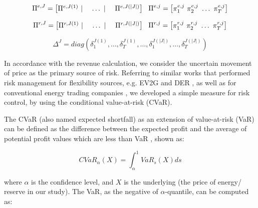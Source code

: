 \begin{equation}
\Pi^{e,J} =
\begin{bmatrix}
\Pi^{e,J(1)}~|~&\dots~|~&\Pi^{e,J(|J|)}
\end{bmatrix} ~~~\\
\Pi^{e,j} = 
\begin{bmatrix}
\pi_1^{e,j}~\pi_2^{e,j}~\dots~\pi_T^{e,j}
\end{bmatrix}
\end{equation}

\begin{equation}
\Pi^{r,J} =
\begin{bmatrix}
\Pi^{r,J(1)}~|~&\dots~|~&\Pi^{r,J(|J|)}
\end{bmatrix} ~~~\\
\Pi^{r,j} = 
\begin{bmatrix}
\pi_1^{r,j}~\pi_2^{r,j}~\dots~\pi_T^{r,j}
\end{bmatrix}
\end{equation}

\begin{equation}
\label{eq:decision-f-revenue-end}
\Delta^J = diag (
\delta_1^{J(1)}, \dots , \delta_T^{J(1)}, \dots, \delta_1^{J(|J|)}, \dots, \delta_T^{J(|J|)})
\end{equation}

In accordance with the revenue calculation, we consider the uncertain movement of price as the primary source of risk. Referring to similar works that performed risk management for flexibility sources, e.g. EV2G \cite{Alipour2017} and DER \cite{Han2017}, as well as for conventional energy trading companies \cite{Mohammadi-Ivatloo2013}, we developed a simple measure for risk control, by using the conditional value-at-risk (CVaR).

The CVaR (also named expected shortfall) as an extension of value-at-risk (VaR) can be defined as the difference between the expected profit and the average of potential profit values which are less than VaR \cite{Rockafellar2000}, shown as:

\begin{equation}
\label{eq:CVaR}
CVaR_\alpha (X) = \int_{\alpha}^{1} VaR_s(X) ds
\end{equation}

where $\alpha$ is the confidence level, and $X$ is the underlying (the price of energy/ reserve in our study). The VaR, as the negative of $\alpha$-quantile, can be computed as:

